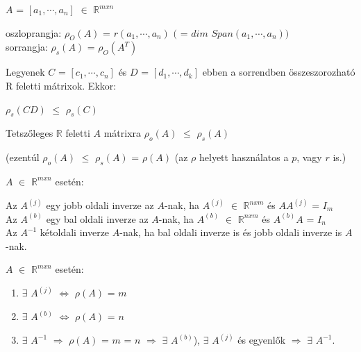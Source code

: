 	
	\begin{frame}
		\begin{tcolorbox}[title={Def.: Sorrang, Oszloprang}]
			$A$ = $[a_1, {\cdots}, a_n]$ $\in$ $\mathbb{R}^{m x n}$ \\
			\mmedskip
			
			oszloprangja: ${\rho}_{O}(A)$ = $r(a_1, {\cdots}, a_n)$ $($ = $dim$ $Span(a_1, {\cdots}, a_n))$\\
			sorrangja: ${\rho}_{s}(A)$ = ${\rho}_{O}(A^T)$\\
		\end{tcolorbox}

		\begin{tcolorbox}[title={Tétel: Mátrixszorzás, dimenzió}]
			Legyenek $C$ = $[c_1, {\cdots}, c_n]$ és $D$ = $[d_1, {\cdots}, d_k]$ ebben a sorrendben összeszorozható
R feletti mátrixok. Ekkor:\\
			\mmedskip
			
	 		${\rho}_{s}(CD)$ $\leq$ ${\rho}_{s}(C)$
		\end{tcolorbox}
		
		\begin{tcolorbox}[title={Tétel: Mátrix, rang}]
			Tetszőleges $\mathbb{R}$ feletti $A$ mátrixra ${\rho}_{o}(A)$ $\leq$ ${\rho}_{s}(A)$\\
			\mmedskip
			
			(ezentúl ${\rho}_{o}(A)$ $\leq$ ${\rho}_{s}(A)$ = ${\rho}(A)$ (az $\rho$ helyett használatos a $p$, vagy $r$ is.)
		\end{tcolorbox}
		
		\begin{tcolorbox}[title={Tétel: Inverz}]
			$A$ $\in$ $\mathbb{R}^{m x n}$ esetén:\\
			\mmedskip
			
			Az $A^{(j)}$ egy jobb oldali inverze az $A$-nak, ha $A^{(j)}$ $\in$ $\mathbb{R}^{n x m}$ és $AA^{(j)}$ = $I_m$\\
			Az $A^{(b)}$ egy bal oldali inverze az $A$-nak, ha $A^{(b)}$ $\in$ $\mathbb{R}^{n x m}$ és $A^{(b)}A$ = $I_n$\\
			Az $A^{-1}$ kétoldali inverze $A$-nak, ha bal oldali inverze is és jobb oldali inverze is $A$-nak. 
		\end{tcolorbox}
		
		\begin{tcolorbox}[title={Tétel: Inverz létezése}]
			$A$ $\in$ $\mathbb{R}^{m x n}$ esetén:\\
			
			\begin{enumerate}
			\item $\exists$ $A^{(j)}$ $\iff$ ${\rho}(A)$ = $m$
			\item $\exists$ $A^{(b)}$ $\iff$ ${\rho}(A)$ = $n$
			\item $\exists$ $A^{-1}$ $\Rightarrow$ ${\rho}(A)$ = $m$ = $n$ $\Rightarrow$ $\exists$ $A^{(b)}$), $\exists$ $A^{(j)}$ és egyenlők $\Rightarrow$ $\exists$ $A^{-1}$.
			\end{enumerate}
		\end{tcolorbox}
	\end{frame}
	

